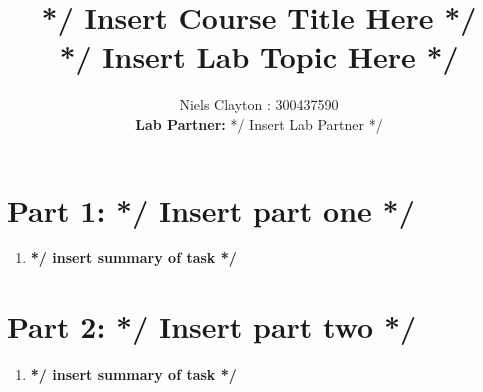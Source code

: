 \documentclass[a4paper,11pt]{article}
\begin{document}
\title{\LARGE{\textbf{*/ Insert Course Title Here */}\\*/ Insert Lab Topic Here */}}
\author{Niels Clayton : 300437590\\ \textbf{Lab Partner: }*/ Insert Lab Partner */}
\date{}
\maketitle

\section*{Part 1: */ Insert part one */}
\begin{enumerate}
\item %
\textbf{*/ insert summary of task */}
\end{enumerate}

\section*{Part 2: */ Insert part two */}
\begin{enumerate}
\item %
\textbf{*/ insert summary of task */}
\end{enumerate}						
\end{document}
